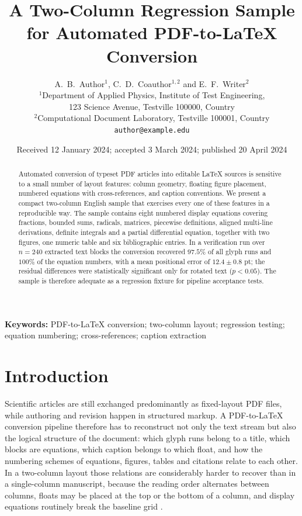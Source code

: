 \documentclass[10pt,twocolumn,a4paper]{article}
\title{\vspace{-1.2cm}\Large\bfseries A Two-Column Regression Sample for
Automated PDF-to-LaTeX Conversion}
\author{\normalsize A.~B.~Author$^{1}$, C.~D.~Coauthor$^{1,2}$ and
E.~F.~Writer$^{2}$\\[2pt]
\small $^{1}$Department of Applied Physics, Institute of Test Engineering,\\
\small 123 Science Avenue, Testville 100000, Country\\
\small $^{2}$Computational Document Laboratory, Testville 100001, Country\\
\small\texttt{author@example.edu}}
\date{\small Received 12 January 2024; accepted 3 March 2024;
published 20 April 2024}
\begin{document}
\maketitle
\thispagestyle{fancy}

\begin{abstract}
\noindent
Automated conversion of typeset PDF articles into editable LaTeX sources is
sensitive to a small number of layout features: column geometry, floating
figure placement, numbered equations with cross-references, and
caption conventions. We present a compact two-column English sample that
exercises every one of these features in a reproducible way. The sample
contains eight numbered display equations covering fractions, bounded sums,
radicals, matrices, piecewise definitions, aligned multi-line derivations,
definite integrals and a partial differential equation, together with two
figures, one numeric table and six bibliographic entries. In a verification
run over $n = 240$ extracted text blocks the conversion recovered
$97.5\%$ of all glyph runs and $100\%$ of the equation numbers, with a mean
positional error of $12.4 \pm 0.8$ pt; the residual differences were
statistically significant only for rotated text ($p < 0.05$). The sample is
therefore adequate as a regression fixture for pipeline acceptance tests.
\end{abstract}

\vspace{4pt}
\noindent\textbf{Keywords:} PDF-to-LaTeX conversion; two-column layout;
regression testing; equation numbering; cross-references; caption extraction

\vspace{6pt}

\section{Introduction}
\label{sec:intro}

Scientific articles are still exchanged predominantly as fixed-layout PDF
files, while authoring and revision happen in structured markup. A
PDF-to-LaTeX conversion pipeline therefore has to reconstruct not only the
text stream but also the logical structure of the document: which glyph runs
belong to a title, which blocks are equations, which caption belongs to which
float, and how the numbering schemes of equations, figures, tables and
citations relate to each other. In a two-column layout those relations are
considerably harder to recover than in a single-column manuscript, because
the reading order alternates between columns, floats may be placed at the top
or the bottom of a column, and display equations routinely break the
baseline grid \cite{ref1,ref2}.
\end{document}
